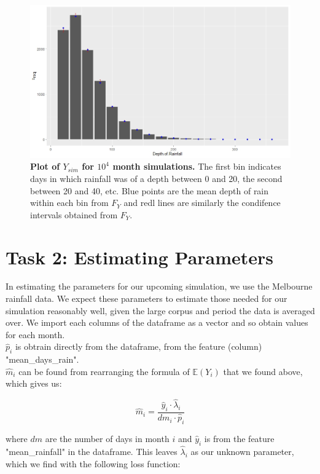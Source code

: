 \documentclass[a4paper, 11pt, oneside]{article}
\begin{document}
\begin{figure}[h]
\centering
\caption{\textbf{Plot of $Y_{sim}$ for $10^4$ month simulations.} The first bin indicates days in which rainfall was of a depth between 0 and 20, the second between 20 and 40, etc.  Blue points are the mean depth of rain within each bin from $F_Y$ and redl lines are similarly the condifence intervals obtained from $F_Y$.}
\includegraphics[width = \textwidth]{BinFreq}
\end{figure}

\newpage
\section{Task 2: Estimating Parameters}

In estimating the parameters for our upcoming simulation, we use the Melbourne rainfall data.  We expect these parameters to estimate those needed for our simulation reasonably well, given the large corpus and period the data is averaged over.  We import each columns of the dataframe as a vector and so obtain values for each month.  \\

$\hat{p}_i$ is obtrain directly from the dataframe, from the feature (column) "mean\_days\_rain".\\

$\hat{m}_i$ can be found from rearranging the formula of $\mathbb{E}(Y_i)$ that we found above, which gives us:

$$\hat{m}_i = \frac{\hat{y}_i \cdot \hat{\lambda}_i}{dm_i \cdot \hat{p}_i}$$

where $dm$ are the number of days in month $i$ and $\hat{y}_i $ is from the feature "mean\_rainfall" in the dataframe.  This leaves $\hat{\lambda}_i$ as our unknown parameter, which we find with the following loss function:
\end{document}
